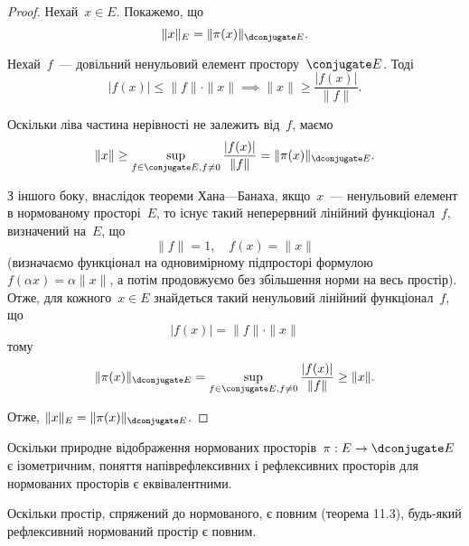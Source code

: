 \begin{proof}
    Нехай~$x \in E$. Покажемо, що
    \begin{equation*}
        \|x\|_E = \|\pi(x)\|_{\dconjugate E}.
    \end{equation*}
    
    Нехай~$f$~--- довільний ненульовий елемент простору~$\conjugate E$. Тоді
    \begin{equation*}
        |f(x)| \le \|f\| \cdot \|x\| \implies \|x\| \ge \frac{|f(x)|}{\|f\|}.
    \end{equation*}
    
    Оскільки ліва частина нерівності не залежить від~$f$, маємо
    \begin{equation*}
        \|x\| \ge \sup_{f \in \conjugate E, f \ne 0} \frac{|f(x)|}{\|f\|} =
        \|\pi(x)\|_{\dconjugate E}.
    \end{equation*}
     
    З іншого боку, внаслідок теореми Хана---Банаха, якщо~$x$~--- ненульовий елемент в нормованому просторі~$E$, то існує такий неперервний лінійний функціонал~$f$, визначений на~$E$, що
    \begin{equation*}
        \|f\| = 1, \quad f(x) = \|x\|
    \end{equation*}
    (визначаємо функціонал на одновимірному підпросторі формулою~$f(\alpha x) = \alpha \|x\|$, а потім продовжуємо без збільшення норми на весь простір). Отже, для кожного~$x \in E$ знайдеться такий ненульовий лінійний функціонал~$f$, що
    \begin{equation*}
        |f(x)| = \|f\| \cdot \|x\|
    \end{equation*}
    тому
    \begin{equation*}
        \|\pi(x)\|_{\dconjugate E} = \sup_{f \in \conjugate E, f \ne 0} \frac{|f(x)|}{\|f\|} \ge \|x\|.
    \end{equation*}
    
    Отже, $\|x\|_E = \|\pi(x)\|_{\dconjugate E}$.
\end{proof}

\begin{remark}
    Оскільки природне відображення нормованих просторів~$\pi: E \to \dconjugate E$ є ізометричним, поняття напіврефлексивних і рефлексивних просторів для нормованих просторів є еквівалентними.
\end{remark}

\begin{remark}
    Оскільки простір, спряжений до нормованого, є повним \error (теорема 11.3), будь-який рефлексивний нормований простір є повним.
\end{remark}

